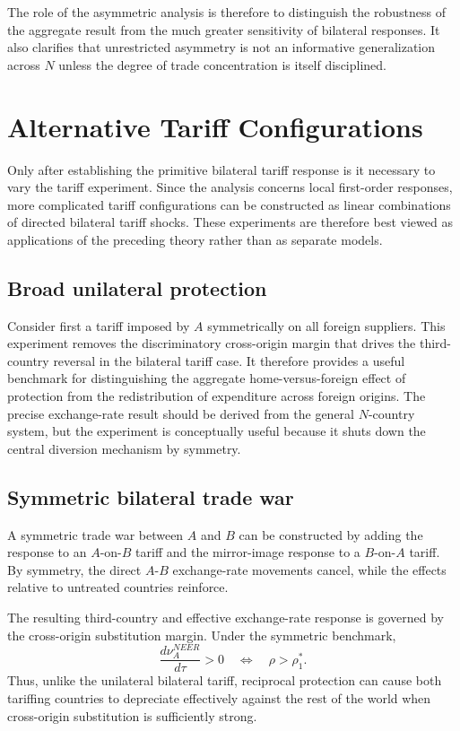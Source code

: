 \documentclass[11pt]{article}
\begin{document}
The role of the asymmetric analysis is therefore to distinguish the robustness of the aggregate result from the much greater sensitivity of bilateral responses. It also clarifies that unrestricted asymmetry is not an informative generalization across $N$ unless the degree of trade concentration is itself disciplined.

\section{Alternative Tariff Configurations}

Only after establishing the primitive bilateral tariff response is it necessary to vary the tariff experiment. Since the analysis concerns local first-order responses, more complicated tariff configurations can be constructed as linear combinations of directed bilateral tariff shocks. These experiments are therefore best viewed as applications of the preceding theory rather than as separate models.

\subsection{Broad unilateral protection}

Consider first a tariff imposed by $A$ symmetrically on all foreign suppliers. This experiment removes the discriminatory cross-origin margin that drives the third-country reversal in the bilateral tariff case. It therefore provides a useful benchmark for distinguishing the aggregate home-versus-foreign effect of protection from the redistribution of expenditure across foreign origins. The precise exchange-rate result should be derived from the general $N$-country system, but the experiment is conceptually useful because it shuts down the central diversion mechanism by symmetry.

\subsection{Symmetric bilateral trade war}

A symmetric trade war between $A$ and $B$ can be constructed by adding the response to an $A$-on-$B$ tariff and the mirror-image response to a $B$-on-$A$ tariff. By symmetry, the direct $A$-$B$ exchange-rate movements cancel, while the effects relative to untreated countries reinforce.

The resulting third-country and effective exchange-rate response is governed by the cross-origin substitution margin. Under the symmetric benchmark,
\[
\frac{d\nu_A^{NEER}}{d\tau}>0
\quad\Longleftrightarrow\quad
\rho>\rho_1^*.
\]
Thus, unlike the unilateral bilateral tariff, reciprocal protection can cause both tariffing countries to depreciate effectively against the rest of the world when cross-origin substitution is sufficiently strong.
\end{document}
